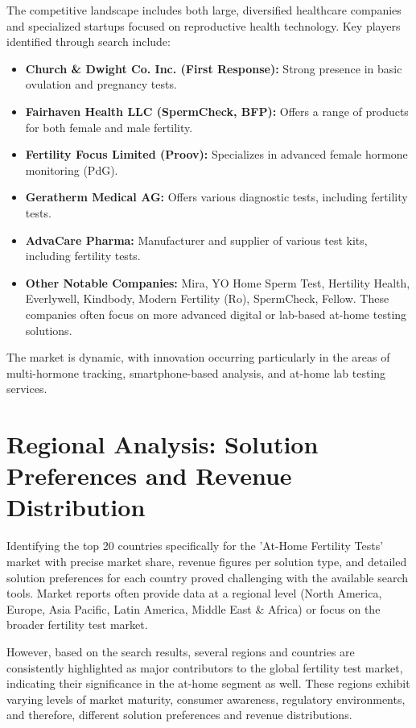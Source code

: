 \documentclass{article}
\begin{document}
The competitive landscape includes both large, diversified healthcare companies and specialized startups focused on reproductive health technology. Key players identified through search include:
\begin{itemize}
    \item \textbf{Church \& Dwight Co. Inc. (First Response):} Strong presence in basic ovulation and pregnancy tests.
    \item \textbf{Fairhaven Health LLC (SpermCheck, BFP):} Offers a range of products for both female and male fertility.
    \item \textbf{Fertility Focus Limited (Proov):} Specializes in advanced female hormone monitoring (PdG).
    \item \textbf{Geratherm Medical AG:} Offers various diagnostic tests, including fertility tests.
    \item \textbf{AdvaCare Pharma:} Manufacturer and supplier of various test kits, including fertility tests.
    \item \textbf{Other Notable Companies:} Mira, YO Home Sperm Test, Hertility Health, Everlywell, Kindbody, Modern Fertility (Ro), SpermCheck, Fellow. These companies often focus on more advanced digital or lab-based at-home testing solutions.
\end{itemize}
The market is dynamic, with innovation occurring particularly in the areas of multi-hormone tracking, smartphone-based analysis, and at-home lab testing services.

\section{Regional Analysis: Solution Preferences and Revenue Distribution}

Identifying the top 20 countries specifically for the 'At-Home Fertility Tests' market with precise market share, revenue figures per solution type, and detailed solution preferences for each country proved challenging with the available search tools. Market reports often provide data at a regional level (North America, Europe, Asia Pacific, Latin America, Middle East & Africa) or focus on the broader fertility test market.

However, based on the search results, several regions and countries are consistently highlighted as major contributors to the global fertility test market, indicating their significance in the at-home segment as well. These regions exhibit varying levels of market maturity, consumer awareness, regulatory environments, and therefore, different solution preferences and revenue distributions.
\end{document}
